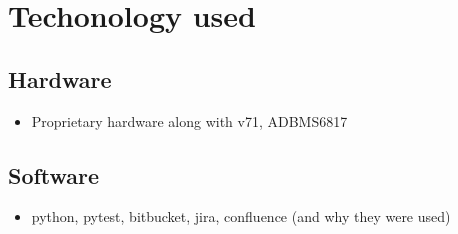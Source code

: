 \chapter{Techonology used} %

\label{ch:tech}


\section{Hardware}
\begin{itemize}
    \item Proprietary hardware along with v71, ADBMS6817
\end{itemize}
\section{Software}
\begin{itemize}
    \item python, pytest, bitbucket, jira, confluence (and why they were used)
\end{itemize}